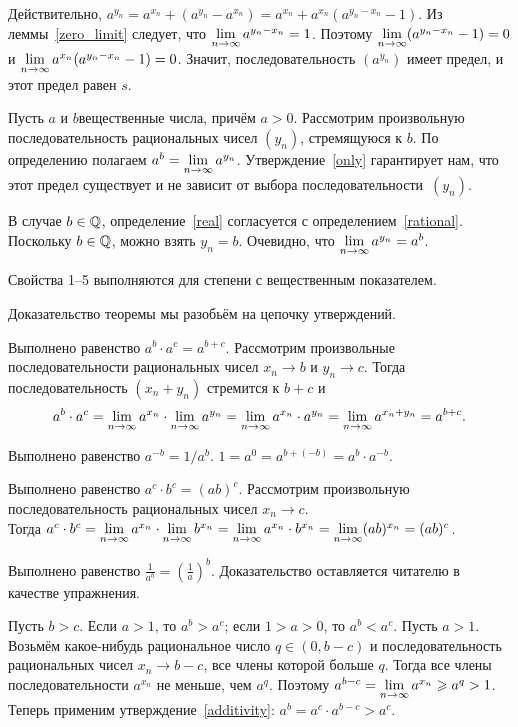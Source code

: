 \documentclass[a4paper,12pt,fleqn]{article}
\begin{document}
Действительно, $a^{y_n} = a^{x_n} + (a^{y_n} - a^{x_n}) = a^{x_n} + a^{x_n}(a^{y_n - x_n} - 1)$.
Из леммы~\ref{zero_limit} следует, что $\lim\limits_{n \rightarrow \infty} a^{y_n - x_n} = 1$. Поэтому $\lim\limits_{n \rightarrow \infty} (a^{y_n - x_n} - 1) = 0$ и $\lim\limits_{n \rightarrow \infty} a^{x_n}(a^{y_n - x_n} - 1) = 0$. Значит, последовательность $(a^{y_n})$ имеет предел, и этот предел равен $s$.

\label{real}
Пусть $a$ и $b$\т вещественные числа, причём $a > 0$. Рассмотрим произвольную последовательность рациональных чисел $(y_n)$, стремящуюся к $b$. По определению полагаем $a^b = \lim\limits_{n \rightarrow \infty} a^{y_n}$. Утверждение~\ref{only} гарантирует нам, что этот предел существует и не зависит от выбора последовательности~$(y_n)$.

В случае $b \in \mathbb{Q}$, определение~\ref{real} согласуется с определением~\ref{rational}.
Поскольку $b \in \mathbb{Q}$, можно взять $y_n = b$. Очевидно, что $\lim\limits_{n \rightarrow \infty} a^{y_n} = a^b$.

\label{real_properties}
Свойства 1--5 выполняются для степени с вещественным показателем.

Доказательство теоремы мы разобьём на цепочку утверждений.


\label{real_additivity}
Выполнено равенство $a^b \cdot a^c = a^{b+c}$.
Рассмотрим произвольные последовательности рациональных чисел $x_n \to b$ и $y_n \to c$. Тогда последовательность $(x_n+y_n)$ стремится к $b+c$ и
\[
a^b \cdot a^c = \lim\limits_{n \rightarrow \infty} a^{x_n} \cdot \lim\limits_{n \rightarrow \infty} a^{y_n} = \lim\limits_{n \rightarrow \infty} a^{x_n}\cdot a^{y_n} = \lim\limits_{n \rightarrow \infty} a^{x_n+y_n} = a^{b+c}.
\]

\label{inversion_1}
Выполнено равенство $a^{-b} = 1/a^b$.
$1 = a^0 = a^{b + (-b)} = a^b \cdot a^{-b}$.

\label{real_multiplicativity}
Выполнено равенство $a^c \cdot b^c = (ab)^c$.
Рассмотрим произвольную последовательность рациональных чисел $x_n \to c$.\\ Тогда $a^c \cdot b^c = \lim\limits_{n \rightarrow \infty} a^{x_n} \cdot \lim\limits_{n \rightarrow \infty} b^{x_n} = \lim\limits_{n \rightarrow \infty} a^{x_n}\cdot b^{x_n} = \lim\limits_{n \rightarrow \infty} (ab)^{x_n} = (ab)^c$.

\label{inversion_2}
Выполнено равенство $\frac{1}{a^b} = \left(\frac1a\right)^b$.
Доказательство оставляется читателю в качестве упражнения.

\label{real_exponent_monotoneness}
Пусть $b > c$. Если $a > 1$, то $a^b > a^c$; если $1 > a > 0$, то $a^b < a^c$.
Пусть $a > 1$. Возьмём какое-нибудь рациональное число $q \in (0, b-c)$ и последовательность рациональных чисел $x_n \to b-c$, все члены которой больше $q$. Тогда все члены последовательности $a^{x_n}$ не меньше, чем $a^q$. Поэтому $a^{b-c} = \lim\limits_{n \rightarrow \infty} a^{x_n} \geqslant a^q > 1$. Теперь применим утверждение~\ref{additivity}: $a^b = a^c \cdot a^{b-c} > a^c$.
\end{document}
